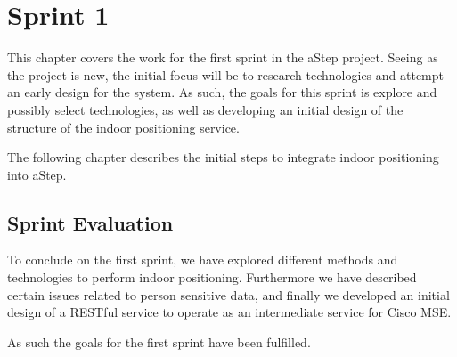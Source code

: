 \chapter{Sprint 1}
This chapter covers the work for the first sprint in the aStep project. Seeing as the project is new, the initial focus will be to research technologies and attempt an early design for the system. As such, the goals for this sprint is explore and possibly select technologies, as well as developing an initial design of the structure of the indoor positioning service. 

The following chapter describes the initial steps to integrate indoor positioning into aStep.






\section{Sprint Evaluation}
To conclude on the first sprint, we have explored different methods and technologies to perform indoor positioning. Furthermore we have described certain issues related to person sensitive data, and finally we developed an initial design of a RESTful service to operate as an intermediate service for Cisco MSE. 

As such the goals for the first sprint have been fulfilled.